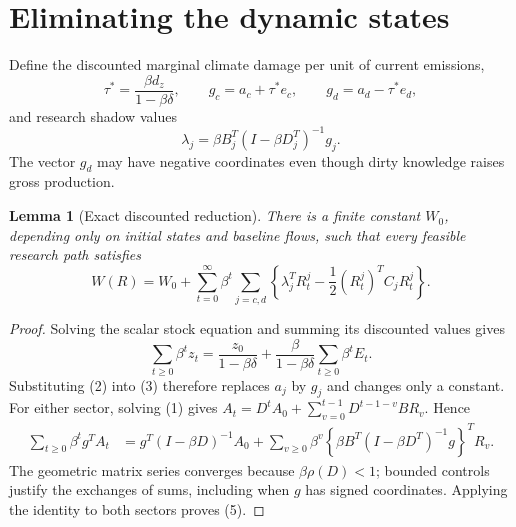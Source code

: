 \documentclass[11pt,a4paper]{article}
\newtheorem{lemma}[theorem]{Lemma}
\theoremstyle{definition}
\theoremstyle{remark}
\begin{document}
\section{Eliminating the dynamic states}
Define the discounted marginal climate damage per unit of current emissions,
\[
 \tau^*=\frac{\beta d_z}{1-\beta\delta},
 \qquad
 g_c=a_c+\tau^*e_c,
 \qquad g_d=a_d-\tau^*e_d,
\]
and research shadow values
\[
 \lambda_j=\beta B_j^T(I-\beta D_j^T)^{-1}g_j.
 \tag{4}
\]
The vector $g_d$ may have negative coordinates even though dirty knowledge raises gross production.

\begin{lemma}[Exact discounted reduction]
There is a finite constant $W_0$, depending only on initial states and baseline flows, such that every feasible research path satisfies
\[
 W(R)=W_0+\sum_{t=0}^\infty\beta^t
 \sum_{j=c,d}\left\{\lambda_j^TR_t^j
              -\frac12(R_t^j)^TC_jR_t^j\right\}.
 \tag{5}
\]
\end{lemma}
\begin{proof}
Solving the scalar stock equation and summing its discounted values gives
\[
 \sum_{t\ge0}\beta^tz_t
 =\frac{z_0}{1-\beta\delta}
  +\frac\beta{1-\beta\delta}\sum_{t\ge0}\beta^tE_t.
\]
Substituting (2) into (3) therefore replaces $a_j$ by $g_j$ and changes only a constant. For either sector, solving (1) gives
$A_t=D^tA_0+\sum_{v=0}^{t-1}D^{t-1-v}BR_v$. Hence
\begin{align*}
 \sum_{t\ge0}\beta^tg^TA_t
 &=g^T(I-\beta D)^{-1}A_0
   +\sum_{v\ge0}\beta^v
      \left\{\beta B^T(I-\beta D^T)^{-1}g\right\}^TR_v.
\end{align*}
The geometric matrix series converges because $\beta\rho(D)<1$; bounded controls justify the exchanges of sums, including when $g$ has signed coordinates. Applying the identity to both sectors proves (5).
\end{proof}
\end{document}
